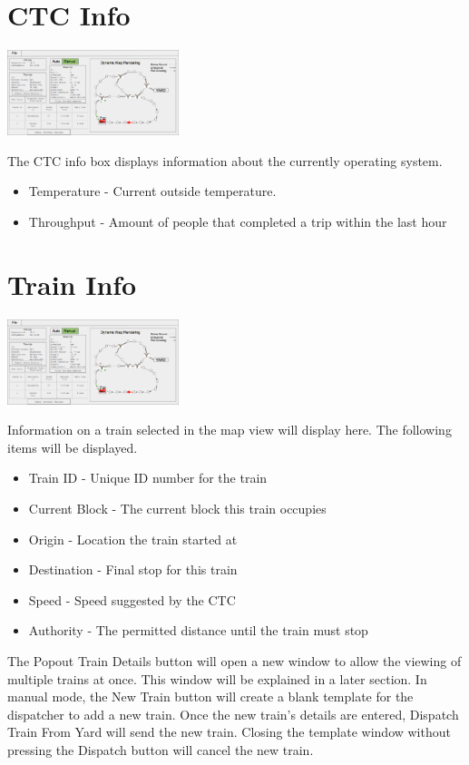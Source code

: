 \documentclass{scrreprt}
\begin{document}
\section{CTC Info}
\begin{center}
  \includegraphics[trim={.45cm 13.5cm 27.45cm 1.7cm},clip,width=5cm]{CTC-main}
\end{center}
The CTC info box displays information about the currently operating system.
\begin{itemize}
  \item Temperature - Current outside temperature.
  \item Throughput - Amount of people that completed a trip within the last hour
\end{itemize}

\section{Train Info}
\begin{center}
  \includegraphics[trim={.45cm 6.6cm 27.45cm 4.6cm},clip,width=5cm]{CTC-main}
\end{center}
Information on a train selected in the map view will display here. The following items 
will be displayed.
\begin{itemize}
  \item Train ID - Unique ID number for the train
  \item Current Block - The current block this train occupies
  \item Origin - Location the train started at
  \item Destination - Final stop for this train
  \item Speed - Speed suggested by the CTC
  \item Authority - The permitted distance until the train must stop
\end{itemize}
The Popout Train Details button will open a new window to allow the viewing of multiple 
trains at once. This window will be explained in a later section. In manual mode, the New 
Train button will create a blank template for the dispatcher to add a new train. Once the 
new train's details are entered, Dispatch Train From Yard will send the new train. Closing 
the template window without pressing the Dispatch button will cancel the new train.
\end{document}
